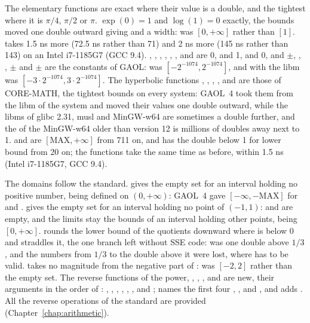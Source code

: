 \medskip
The elementary functions are exact where their value is a double, and the
tightest where it is $\pi/4$, $\pi/2$ or $\pi$.\newinvfive{} $\exp(0) = 1$
and $\log(1) = 0$ exactly, the bounds moved one double outward giving
 and  a width:  was
$[0, +\infty]$ rather than $[1]$.  takes 1.5 ns more (72.5 ns
rather than 71) and  2 ns more (145 ns rather than 143) on
an Intel i7-1185G7 (GCC 9.4). , , ,
, , ,  and
 are 0,  and  1, 
and  0, and $\pm$, ,
, $\pm$ and $\pm$
are the constants of GAOL:  was
$[-2^{-1074}, 2^{-1074}]$, and  with the libm was
$[-3 \cdot 2^{-1074}, 3 \cdot 2^{-1074}]$. The hyperbolic functions
, , , ,  and
 are those of CORE-MATH, the tightest bounds on every system:
GAOL~4 took them from the libm of the system and moved their values one double
outward, while the libms of glibc 2.31, musl and MinGW-w64 are sometimes a
double further, and the  of the MinGW-w64 older than version 12 is
millions of doubles away next to 1.  and  are
$[\mathrm{MAX}, +\infty]$ from 711 on, and  has the double below
1 for lower bound from 20 on; the functions take the same time as before,
within 1.5 ns (Intel i7-1185G7, GCC 9.4).

\medskip
The domains follow the standard.\newinvfive{}  gives the empty
set for an interval holding no positive number,  being defined on
$(0, +\infty)$: GAOL~4 gave $[-\infty, -\mathrm{MAX}]$ for  and .  gives the empty set for an interval
holding no point of $(-1, 1)$:  and 
are empty, and the limits stay the bounds of an interval holding other
points,  being $[0, +\infty]$.  rounds
the lower bound of the quotients downward where  is below 0 and
 straddles it, the one branch left without SSE code:
 was one double above $1/3$, and the
numbers from $1/3$ to the double above it were lost, where  has
to be valid.  takes no magnitude from the negative part
of :  was $[-2, 2]$ rather than
the empty set. The reverse functions of the power, , ,
,  and  are new, their arguments in the
order of : ,
, ,
, ,
,  and ;  names the first four ,
,  and , and adds
. All the reverse operations of the standard are
provided (Chapter~\ref{chap:arithmetic}).

